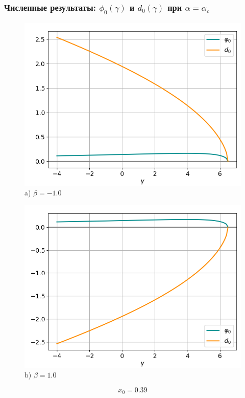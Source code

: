 \documentclass[fullscreen=true, unicode, bookmarks=false]{beamer}
\begin{document}
\begin{frame}
\frametitle{ Численные результаты: $ \phi_0(\gamma) $ и $ d_0(\gamma) $ при $ \alpha=\alpha_c $ }

\begin{figure} 
\begin{minipage}[h]{0.49\linewidth}
\begin{center}
\includegraphics[scale=0.33]{oscillating_phi0d0_x0_039_beta_-1.png} \\ {\scriptsize a) $ \beta = -1.0 $}
\end{center}
\end{minipage} 
\hfill
\begin{minipage}[h]{0.49\linewidth}
\begin{center}
\includegraphics[scale=0.33]{oscillating_phi0d0_x0_039_beta_1.png}  \\ {\scriptsize b) $ \beta = 1.0 $}
\end{center}
\end{minipage} 
\end{figure}

$$ x_0 = 0.39 $$

\end{frame}
\end{document}
